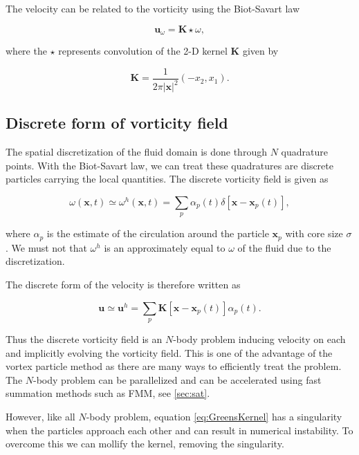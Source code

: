 The velocity can be related to the vorticity using the Biot-Savart law

	\begin{equation}
	\mathbf{u}_{\omega} = \mathbf{K}\star\omega,
	\end{equation}
	
where the $\star$ represents convolution of the 2-D kernel $\mathbf{K}$ given by

	\begin{equation}
	\mathbf{K} = \frac{1}{2\pi\left|\mathbf{x}\right|^2}\left(-x_2,x_1\right).
	\label{eq:GreensKernel}
	\end{equation}
	
\subsection{Discrete form of vorticity field}
The spatial discretization of the fluid domain is done through $N$ quadrature points. With the Biot-Savart law, we can treat these quadratures are discrete particles carrying the local quantities. The discrete vorticity field is given as

	\begin{equation}
	\omega\left(\mathbf{x},t\right) \simeq \omega^h\left(\mathbf{x},t\right) = \sum_{p}\alpha_p\left(t\right)\delta \left[\mathbf{x}-\mathbf{x}_p\left(t\right)\right],
	\end{equation}

where $\alpha_{p}$ is the estimate of the circulation around the particle $\mathbf{x}_p$ with core size $\sigma$. We must not that $\omega^h$ is an approximately equal to $\omega$ of the fluid due to the discretization.

The discrete form of the velocity is therefore written as

	\begin{equation}
	\mathbf{u} \simeq \mathbf{u}^h = \sum_p \mathbf{K}\left[\mathbf{x}-\mathbf{x}_p\left(t\right)\right]\alpha_p\left(t\right).
	\end{equation}
	
Thus the discrete vorticity field is an $N$-body problem inducing velocity on each and implicitly evolving the vorticity field. This is one of the advantage of the vortex particle method as there are many ways to efficiently treat the problem. The $N$-body problem can be parallelized and can be accelerated using fast summation methods such as FMM, see \ref{sec:sat}.
	
However, like all $N$-body problem, equation \ref{eq:GreensKernel} has a singularity when the particles approach each other and can result in numerical instability. To overcome this we can mollify the kernel, removing the singularity.

